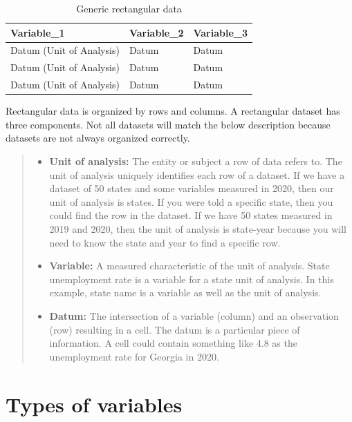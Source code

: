 \documentclass[
]{book}
\providecommand{\tightlist}{%
  \setlength{\itemsep}{0pt}\setlength{\parskip}{0pt}}
\begin{document}
\begin{table}

\caption{\label{tab:print-generic}Generic rectangular data}
\centering
\begin{tabular}[t]{l|l|l}
\hline
Variable\_1 & Variable\_2 & Variable\_3\\
\hline
Datum (Unit of Analysis) & Datum & Datum\\
\hline
Datum (Unit of Analysis) & Datum & Datum\\
\hline
Datum (Unit of Analysis) & Datum & Datum\\
\hline
\end{tabular}
\end{table}

Rectangular data is organized by rows and columns. A rectangular dataset has three components. Not all datasets will match the below description because datasets are not always organized correctly.

\begin{quote}
\begin{itemize}
\tightlist
\item
  \textbf{Unit of analysis:} The entity or subject a row of data refers to. The unit of analysis uniquely identifies each row of a dataset. If we have a dataset of 50 states and some variables measured in 2020, then our unit of analysis is states. If you were told a specific state, then you could find the row in the dataset. If we have 50 states measured in 2019 and 2020, then the unit of analysis is state-year because you will need to know the state and year to find a specific row.
\item
  \textbf{Variable:} A measured characteristic of the unit of analysis. State unemployment rate is a variable for a state unit of analysis. In this example, state name is a variable as well as the unit of analysis.
\item
  \textbf{Datum:} The intersection of a variable (column) and an observation (row) resulting in a cell. The datum is a particular piece of information. A cell could contain something like 4.8 as the unemployment rate for Georgia in 2020.
\end{itemize}
\end{quote}

\hypertarget{types-of-variables}{%
\section{Types of variables}\label{types-of-variables}}
\end{document}
